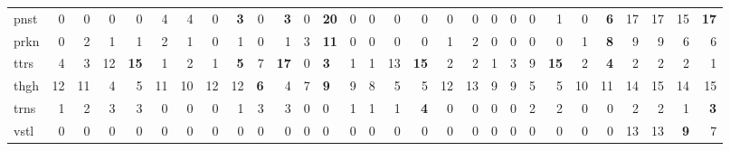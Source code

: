 \begin{center}
\begin{tabular}{lrrrrrrrrrrrlrrrrrrrrrrrrrrrr}
pnst & 0 & 0 & 0 & 0 & 4 & 4 & 0 & \textbf{3} & 0 & \textbf{3} & 0 & \textbf{20} & 0 & 0 & 0 & 0 & 0 & 0 & 0 & 0 & 0 & 1 & 0 & \textbf{6} & 17 & 17 & 15 & \textbf{17}\\
prkn & 0 & 2 & 1 & 1 & 2 & 1 & 0 & 1 & 0 & 1 & 3 & \textbf{11} & 0 & 0 & 0 & 0 & 1 & 2 & 0 & 0 & 0 & 0 & 1 & \textbf{8} & 9 & 9 & 6 & 6\\
ttrs & 4 & 3 & 12 & \textbf{15} & 1 & 2 & 1 & \textbf{5} & 7 & \textbf{17} & 0 & \textbf{3} & 1 & 1 & 13 & \textbf{15} & 2 & 2 & 1 & 3 & 9 & \textbf{15} & 2 & \textbf{4} & 2 & 2 & 2 & 1\\
thgh & 12 & 11 & 4 & 5 & 11 & 10 & 12 & 12 & \textbf{6} & 4 & 7 & \textbf{9} & 9 & 8 & 5 & 5 & 12 & 13 & 9 & 9 & 5 & 5 & 10 & 11 & 14 & 15 & 14 & 15\\
trns & 1 & 2 & 3 & 3 & 0 & 0 & 0 & 1 & 3 & 3 & 0 & 0 & 1 & 1 & 1 & \textbf{4} & 0 & 0 & 0 & 0 & 2 & 2 & 0 & 0 & 2 & 2 & 1 & \textbf{3}\\
vstl & 0 & 0 & 0 & 0 & 0 & 0 & 0 & 0 & 0 & 0 & 0 & 0 & 0 & 0 & 0 & 0 & 0 & 0 & 0 & 0 & 0 & 0 & 0 & 0 & 13 & 13 & \textbf{9} & 7\\
\hline
\end{tabular}
\end{center}
